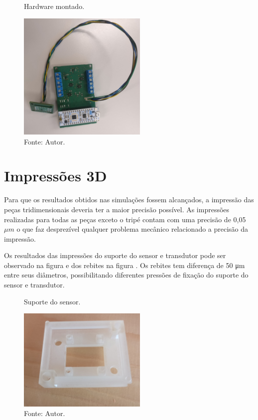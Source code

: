 \begin{figure}[H]
    \centering
     \caption{Hardware montado.}
     \includegraphics[width=0.55\textwidth]{./img/PCBs/placaMontada.jpg}
     \caption*{Fonte: Autor.}\label{fig:hardwareSistema}
\end{figure}

\section{Impressões 3D}

Para que os resultados obtidos nas simulações fossem alcançados, a impressão das peças tridimensionais deveria ter a maior precisão possível. As impressões realizadas para todas as peças exceto o tripé contam com uma precisão de 0,05 $\mu m$ o que faz desprezível qualquer problema mecânico relacionado a precisão da impressão.

Os resultados das impressões do suporte do sensor e transdutor pode ser observado na figura \label{fig:supsenim} e dos rebites na figura \label{fig:rebim}. Os rebites tem diferença de 50 μm entre seus diâmetros, possibilitando diferentes pressões de fixação do suporte do sensor e transdutor.

\begin{figure}[H]
    \centering
     \caption{Suporte do sensor.}
     \includegraphics[width=0.55\textwidth]{./img/impressoes3D/suporte_sensor.jpg}
     \caption*{Fonte: Autor.}\label{fig:supsenim}
\end{figure}

